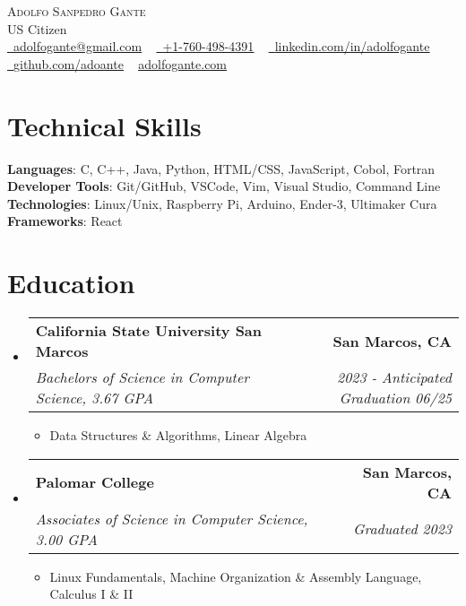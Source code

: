 \documentclass[letterpaper,11pt]{article}
\makeatletter
\newcommand{\resumeItem}[1]{
  \item\small{
    {#1 \vspace{-3pt}}
  }
}
\newcommand{\resumeSubheading}[4]{
  \vspace{-3pt}\item
    \begin{tabular*}{1.0\textwidth}[t]{l@{\extracolsep{\fill}}r}
      \textbf{#1} & \textbf{\small #2} \\
      \textit{\small#3} & \textit{\small #4} \\
    \end{tabular*}\vspace{-7pt}
}
\newcommand{\resumeSubHeadingListStart}{\begin{itemize}[leftmargin=0.0in, label={}]}
\newcommand{\resumeSubHeadingListEnd}{\end{itemize}}
\newcommand{\resumeItemListStart}{\begin{itemize}}
\newcommand{\resumeItemListEnd}{\end{itemize}\vspace{0pt}}
\makeatother
\begin{document}
    \begin{center}
        {\Huge\scshape Adolfo Sanpedro Gante} 
        \\ US Citizen \\
        \small
        \href{mailto:EMAIL}{\raisebox{-0.2\height}\faEnvelope\  \underline{adolfogante@gmail.com}} ~
        \href{tel:+17604984391}{\raisebox{-0.2\height}\faMobile\  \underline{+1-760-498-4391}} ~ 
        \href{LINK}{\raisebox{-0.2\height}\faLinkedin\ \underline{linkedin.com/in/adolfogante}}  ~
        \href{LINK}{\raisebox{-0.2\height}\faGithub\ \underline{github.com/adoante}} ~
        \href{LINK}{\underline{adolfogante.com}}
    \end{center}

\section{Technical Skills}

    \vspace{-7pt}
    \begin{itemize}
    [leftmargin=0.15in, label={}]\small{\item{
        \textbf{Languages}{: C, C++, Java, Python, HTML/CSS, JavaScript, Cobol, Fortran} \\
        \textbf{Developer Tools}{: Git/GitHub, VSCode, Vim, Visual Studio, Command Line} \\
        \textbf{Technologies}{: Linux/Unix, Raspberry Pi, Arduino, Ender-3,  Ultimaker Cura} \\
        \textbf{Frameworks}{: React} \\
        }}
    \end{itemize}

    
\section{Education}
  \resumeSubHeadingListStart
  
    \resumeSubheading
    {California State University San Marcos}{San Marcos, CA}
    {Bachelors of Science in Computer Science, 3.67 GPA}{2023 - Anticipated Graduation 06/25}
      \resumeItemListStart
        \resumeItem{Data Structures \& Algorithms, Linear Algebra}
      \resumeItemListEnd
    \resumeSubheading
    {Palomar College}{San Marcos, CA}
    {Associates of Science in Computer Science, 3.00 GPA}{Graduated 2023}
      \resumeItemListStart
        \resumeItem{Linux Fundamentals, Machine Organization \& Assembly Language, Calculus I \& II}
      \resumeItemListEnd
  \resumeSubHeadingListEnd
\end{document}
